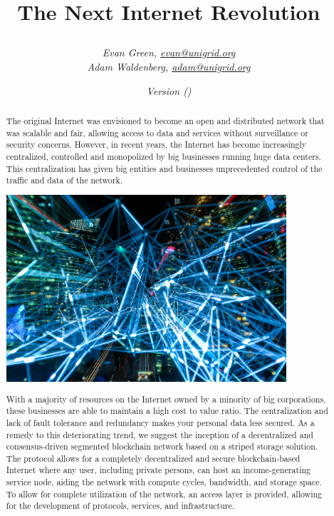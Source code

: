 \documentclass{article}
\author{\textit{Evan Green, \href{mailto:evan@unigrid.org}{evan@unigrid.org}}\\
\textit{Adam Waldenberg, \href{mailto:adam@unigrid.org}{adam@unigrid.org}}}
\affil{The Unigrid Foundation}
\title{
	\makebox[\textwidth]{\hspace{600pt}\tikz \fill[orange] (18,1.4) rectangle (0,0);}
	\vspace{60pt}
	\begin{center}
		
	\end{center}
	\vspace{35pt}
	\textbf{The Next Internet Revolution}
	\vspace{10pt}
}
\date{\emph{Version \gitRel\hspace{5pt}(\gitCommitterDate)}}
\begin{document}
\setlength{\headheight}{40pt}

\clearpage\maketitle
\thispagestyle{empty}
\newpage
\vspace*{+40pt}
\begin{abstract}
\noindent The original Internet was envisioned to become an open and distributed network that was scalable and fair, allowing access to data and services without surveillance or security concerns. However, in recent years, the Internet has become increasingly centralized, controlled and monopolized by big businesses running huge data centers. This centralization has given big entities and businesses unprecedented control of the traffic and data of the network.

\begin{mdframed}[style=textimage]
	\includegraphics[width=295pt]{lights}
\end{mdframed}

\noindent With a majority of resources on the Internet owned by a minority of big corporations, these businesses are able to maintain a high cost to value ratio. The centralization and lack of fault tolerance and redundancy makes your personal data less secured. As a remedy to this deteriorating trend, we suggest the inception of a decentralized and consensus-driven segmented blockchain network based on a striped storage solution. The protocol allows for a completely decentralized and secure blockchain-based Internet where any user, including private persons, can host an income-generating service node, aiding the network with compute cycles, bandwidth, and storage space. To allow for complete utilization of the network, an access layer is provided, allowing for the development of protocols, services, and infrastructure.
\end{abstract}
\end{document}
